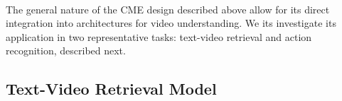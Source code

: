 







\\
The general nature of the CME design described above allow for its direct integration into architectures for video understanding.  We its investigate its application in two representative tasks: text-video retrieval and action recognition, described next.

\subsection{Text-Video Retrieval Model}

